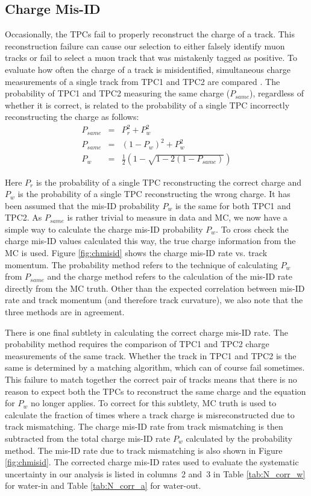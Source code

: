 \subsection{Charge Mis-ID}
\label{sec:Systematics_ChargeMisID}

Occasionally, the TPCs fail to properly reconstruct the charge of a track. This reconstruction failure can cause our selection to either falsely identify muon tracks or fail to select a muon track that was mistakenly tagged as positive. To evaluate how often the charge of a track is misidentified, simultaneous charge measurements of a single track from TPC1 and TPC2 are compared \cite{chmisidtn}. The probability of TPC1 and TPC2 measuring the same charge ($P_{same}$), regardless of whether it is correct, is related to the probability of a single TPC incorrectly reconstructing the charge as follows:
\begin{eqnarray*}
P_{same} & = & P^2_{r} + P^2_{w} \\
P_{same} & = & (1-P_{w})^2 + P^2_w \\
P_w & = & \frac{1}{2}\left( 1- \sqrt{1-2(1-P_{same})} \right)
\end{eqnarray*}

Here $P_r$ is the probability of a single TPC reconstructing the correct charge and $P_w$ is the probability of a single TPC reconstructing the wrong charge. It has been assumed that the mis-ID probability $P_w$ is the same for both TPC1 and TPC2. As $P_{same}$ is rather trivial to measure in data and MC, we now have a simple way to calculate the charge mis-ID probability $P_w$. To cross check the charge mis-ID values calculated this way, the true charge information from the MC is used. Figure \ref{fig:chmisid} shows the charge mis-ID rate vs. track momentum. The probability method refers to the technique of calculating $P_w$ from $P_{same}$ and the charge method refers to the calculation of the mis-ID rate directly from the MC truth. Other than the expected correlation between mis-ID rate and track momentum (and therefore track curvature), we also note that the three methods are in agreement.

There is one final subtlety in calculating the correct charge mis-ID rate. The probability method requires the comparison of TPC1 and TPC2 charge measurements of the same track. Whether the track in TPC1 and TPC2 is the same is determined by a matching algorithm, which can of course fail sometimes. This failure to match together the correct pair of tracks means that there is no reason to expect both the TPCs to reconstruct the same charge and the equation for $P_w$ no longer applies. To correct for this subtlety, MC truth is used to calculate the fraction of times where a track charge is misreconstructed due to track mismatching. The charge mis-ID rate from track mismatching is then subtracted from the total charge mis-ID rate $P_w$ calculated by the probability method. The mis-ID rate due to track mismatching is also shown in Figure \ref{fig:chmisid}. The corrected charge mis-ID rates used to evaluate the systematic uncertainty in our analysis is listed in columns~2 and~3 in Table \ref{tab:N_corr_w} for water-in and Table \ref{tab:N_corr_a} for water-out.

